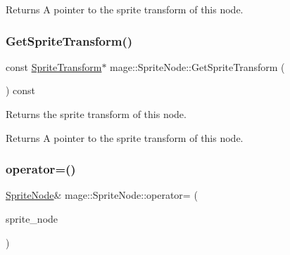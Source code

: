 \begin{DoxyReturn}{Returns}
A pointer to the sprite transform of this node. 
\end{DoxyReturn}
\hypertarget{classmage_1_1_sprite_node_a021d8d7d51a05330bfa6d034482988a0}{}\label{classmage_1_1_sprite_node_a021d8d7d51a05330bfa6d034482988a0} 
\subsubsection{\texorpdfstring{Get\+Sprite\+Transform()}{GetSpriteTransform()}\hspace{0.1cm}{\footnotesize\ttfamily [2/2]}}
{\footnotesize\ttfamily const \hyperlink{classmage_1_1_sprite_transform}{Sprite\+Transform}$\ast$ mage\+::\+Sprite\+Node\+::\+Get\+Sprite\+Transform (\begin{DoxyParamCaption}{ }\end{DoxyParamCaption}) const\hspace{0.3cm}{\ttfamily [noexcept]}}

Returns the sprite transform of this node.

\begin{DoxyReturn}{Returns}
A pointer to the sprite transform of this node. 
\end{DoxyReturn}
\hypertarget{classmage_1_1_sprite_node_a009228c9f53671a4275534ceb7733bd0}{}\label{classmage_1_1_sprite_node_a009228c9f53671a4275534ceb7733bd0} 
\subsubsection{\texorpdfstring{operator=()}{operator=()}\hspace{0.1cm}{\footnotesize\ttfamily [1/2]}}
{\footnotesize\ttfamily \hyperlink{classmage_1_1_sprite_node}{Sprite\+Node}\& mage\+::\+Sprite\+Node\+::operator= (\begin{DoxyParamCaption}\item[{const \hyperlink{classmage_1_1_sprite_node}{Sprite\+Node} \&}]{sprite\+\_\+node }\end{DoxyParamCaption})\hspace{0.3cm}{\ttfamily [delete]}}

